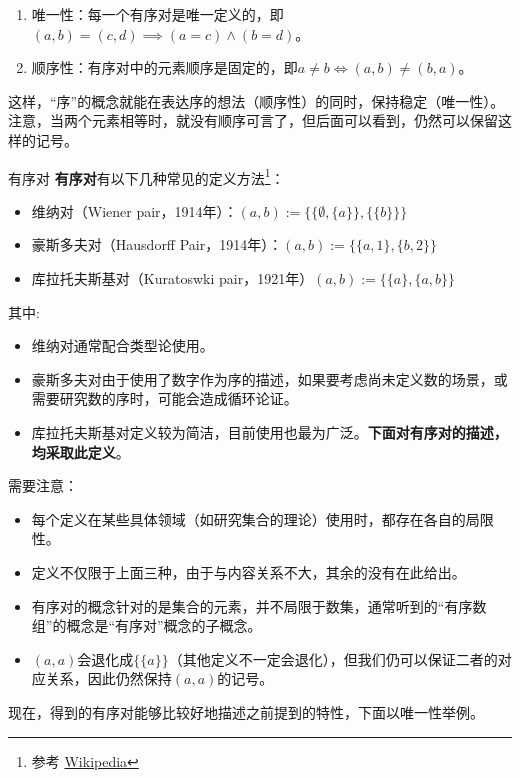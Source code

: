 \begin{enumerate}
\item 唯一性：每一个有序对是唯一定义的，即$(a, b) = (c, d)\implies (a = c) \land (b = d)$。
\item 顺序性：有序对中的元素顺序是固定的，即$a\neq b\iff(a, b)\neq (b, a)$。
\end{enumerate}

这样，“序”的概念就能在表达序的想法（顺序性）的同时，保持稳定（唯一性）。注意，当两个元素相等时，就没有顺序可言了，但后面可以看到，仍然可以保留这样的记号。

\begin{definition}{有序对}
\textbf{有序对}有以下几种常见的定义方法\footnote{参考 \href{https://en.wikipedia.org/wiki/Ordered_pair}{Wikipedia}}：
\begin{itemize}
\item 维纳对（Wiener pair，1914年）：$(a, b):= \{\{\emptyset,\{ a\}\}, \{\{b\}\}\} $
\item 豪斯多夫对（Hausdorff Pair，1914年）：$ (a, b):= \{\{a, 1\}, \{b, 2\}\} $
\item 库拉托夫斯基对（Kuratoswki pair，1921年）$(a, b) := \{\{a\}, \{a, b\}\}$
\end{itemize}
\end{definition}
其中:
\begin{itemize}
\item 维纳对通常配合类型论使用。
\item 豪斯多夫对由于使用了数字作为序的描述，如果要考虑尚未定义数的场景，或需要研究数的序时，可能会造成循环论证。
\item 库拉托夫斯基对定义较为简洁，目前使用也最为广泛。\textbf{下面对有序对的描述，均采取此定义}。
\end{itemize}

需要注意：
\begin{itemize}
\item 每个定义在某些具体领域（如研究集合的理论）使用时，都存在各自的局限性。
\item 定义不仅限于上面三种，由于与内容关系不大，其余的没有在此给出。
\item 有序对的概念针对的是集合的元素，并不局限于数集，通常听到的“有序数组”的概念是“有序对”概念的子概念。
\item $(a,a)$会退化成$\{\{a\}\}$（其他定义不一定会退化），但我们仍可以保证二者的对应关系，因此仍然保持$(a,a)$的记号。
\end{itemize}

现在，得到的有序对能够比较好地描述之前提到的特性，下面以唯一性举例。

